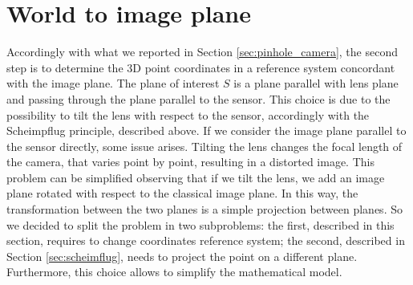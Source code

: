 \section{World to image plane}
\label{sec:wrd2cam}
Accordingly with what we reported in Section \ref{sec:pinhole_camera}, the second step is to determine the 3D point coordinates in a reference system concordant with the image plane. The plane of interest $S$ is a plane parallel with lens plane and passing through the plane parallel to the sensor.  This choice is due to the possibility to tilt the lens with respect to the sensor, accordingly with the Scheimpflug principle, described above. If we consider the image plane parallel to the sensor directly, some issue arises. Tilting the lens changes the focal length of the camera, that varies point by point, resulting in a distorted image. This problem can be simplified observing that if we tilt the lens, we add an image plane rotated with respect to the classical image plane. In this way, the transformation between the two planes is a simple projection between planes. So we decided to split the problem in two subproblems: the first, described in this section, requires to change coordinates reference system; the second, described in Section \ref{sec:scheimflug}, needs to project the point on a different plane. Furthermore, this choice allows to simplify the mathematical model. \\


